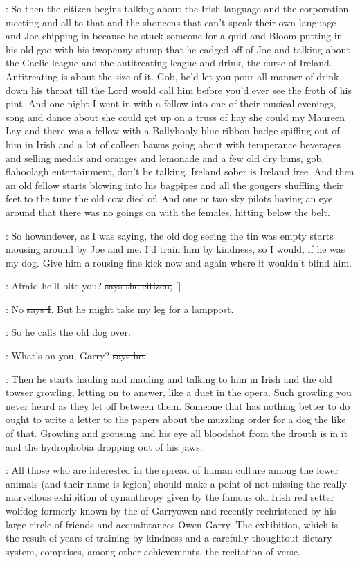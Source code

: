 \Nq:
So then the citizen begins talking about the Irish language and the
corporation meeting and all to that and the shoneens that can't speak
their own language and Joe chipping in because he stuck someone for
a quid and Bloom putting in his old goo with his twopenny stump that
he cadged off of Joe and talking about the Gaelic league and the
antitreating league and drink, the curse of Ireland. Antitreating
is about the size of it. Gob, he'd let you pour all manner of drink
down his throat till the Lord would call him before you'd ever
see the froth of his pint. And one night I went in with a fellow
into one of their musical evenings, song and dance about she could
get up on a truss of hay she could my Maureen Lay and there was a fellow
with a Ballyhooly blue ribbon badge spiffing out of him in Irish and a lot
of colleen bawns going about with temperance beverages and selling medals
and oranges and lemonade and a few old dry buns, gob, flahoolagh
entertainment, don't be talking. Ireland sober is Ireland free. And then
an old fellow starts blowing into his bagpipes and all the gougers
shuffling their feet to the tune the old cow died of. And one or two sky
pilots having an eye around that there was no goings on with the females,
hitting below the belt.

\Nq:
So howandever, as I was saying, the old dog seeing the tin was empty
starts mousing around by Joe and me. I'd train him by kindness, so I
would, if he was my dog. Give him a rousing fine kick now and again where
it wouldn't blind him.

\citizen:
Afraid he'll bite you?
\sout{says the citizen,} []

:
No \sout{says I}. But he might take my leg for a lamppost.

\Nq:
So he calls the old dog over.

\citizen:
What's on you, Garry? \sout{says he.}

\Nq:
Then he starts hauling and mauling and talking to him in Irish and
the old towser growling, letting on to answer, like a duet in the opera.
Such growling you never heard as they let off between them. Someone that
has nothing better to do ought to write a letter  to the
papers about the muzzling order for a dog the like of that. Growling and
grousing and his eye all bloodshot from the drouth is in it and the
hydrophobia dropping out of his jaws.

:
All those who are interested in the spread of human culture among
the lower animals (and their name is legion) should make a point of not
missing the really marvellous exhibition of cynanthropy given by the
famous old Irish red setter wolfdog formerly known by the  of
Garryowen and recently rechristened by his large circle of friends and
acquaintances Owen Garry. The exhibition, which is the result of years of
training by kindness and a carefully thoughtout dietary system, comprises,
among other achievements, the recitation of verse.

